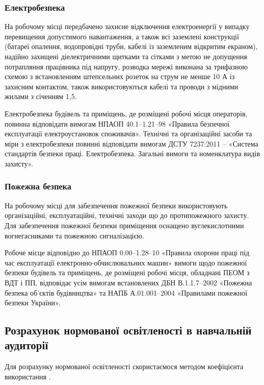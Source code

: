 \documentclass[a4paper,ukrainian,utf8,nocolumnsxix,floatsection,equationsection]{eskdtext}
\renewcommand\paragraph{\subsubsection}
\begin{document}
\paragraph{Електробезпека}

На робочому місці передбачено захисне відключення електроенергії у випадку перевищення допустимого навантаження, а також всі заземлені конструкції (батареї опалення,  водопровідні труби, кабелі із заземленим відкритим екраном), надійно захищені діелектричними щитками та сітками з метою не допущення потрапляння працівника під напругу, розводка мережі виконана за трифазною схемою з встановленням штепсельних розеток на струм не менше 10 А із захисним контактом, також використовуються кабелі та проводи з мідними жилами з січенням 1,5.

Електробезпека будівель та приміщень, де розміщені робочі місця операторів, повинна відповідати вимогам НПАОП 40.1–1.21–98 «Правила безпечної експлуатації електроустановок споживачів». Технічні та організаційні засоби та міри з електробезпеки повинні відповідати вимогам ДСТУ 7237:2011 – «Система стандартів безпеки праці. Електробезпека. Загальні вимоги та номенклатура видів захисту».

\paragraph{Пожежна безпека}

На робочому місці для забезпечення пожежної безпеки використовують організаційні, експлуатаційні, технічні заходи що до протипожежного захисту. Для забезпечення пожежної безпеки  приміщення оснащено вуглекислотними вогнегасниками та пожежною сигналізацією.

Робоче місце відповідно до НПАОП 0.00–1.28–10 «Правила охорони праці під час експлуатації електронно-обчислювальних машин» вимоги  щодо пожежної безпеки будівель та приміщень, де розміщені робочі місця, обладнані ПЕОМ з ВДТ і ПП, відповідає усім вимогам встановлених ДБН В.1.1.7–2002 «Пожежна безпека  об'єктів будівництва» та НАПБ А.01.001–2004 «Правилами пожежної безпеки України».

\subsection{Розрахунок нормованої освітленості в навчальній аудиторії}

Для розрахунку нормованої освітленості скористаємося методом коефіцієнта використання \cite{work:safety:18}.
\end{document}
